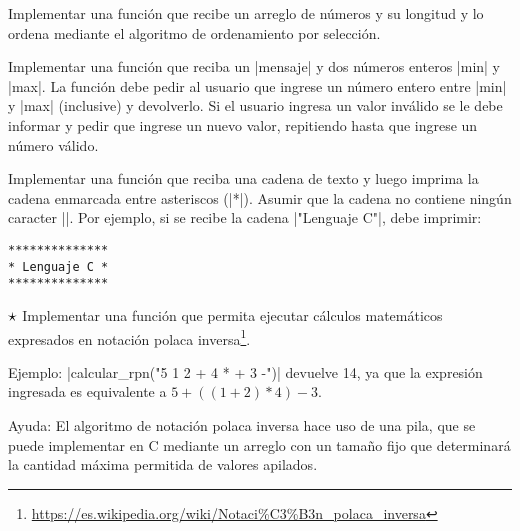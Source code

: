 \begin{ejercicio}
Implementar una función que recibe un arreglo de números y su longitud y
lo ordena mediante el algoritmo de ordenamiento por selección.
\end{ejercicio}

\begin{ejercicio}
Implementar una función que reciba un |mensaje| y dos números enteros |min| y
|max|. La función debe pedir al usuario que ingrese un número entero entre
|min| y |max| (inclusive) y devolverlo. Si el usuario ingresa un valor
inválido se le debe informar y pedir que ingrese un nuevo valor, repitiendo
hasta que ingrese un número válido.
\end{ejercicio}

\begin{ejercicio}
Implementar una función que reciba una cadena de texto y
luego imprima la cadena enmarcada entre asteriscos (|*|). Asumir que la cadena
no contiene ningún caracter |\n|. Por ejemplo, si se recibe la cadena
|"Lenguaje C"|, debe imprimir:

\begin{verbatim}
**************
* Lenguaje C *
**************
\end{verbatim}
\end{ejercicio}

\begin{ejercicio}
$\dificil$ Implementar una función que permita ejecutar cálculos matemáticos
expresados en notación polaca inversa\footnote{%
\url{https://es.wikipedia.org/wiki/Notaci\%C3\%B3n_polaca_inversa}}.

Ejemplo: |calcular_rpn("5 1 2 + 4 * + 3 -")| devuelve 14, ya que la expresión
ingresada es equivalente a $5+((1+2)*4)-3$.

Ayuda: El algoritmo de notación polaca inversa hace uso de una pila,
que se puede implementar en C mediante un arreglo con un tamaño
fijo que determinará la cantidad máxima permitida de valores apilados.
\end{ejercicio}
